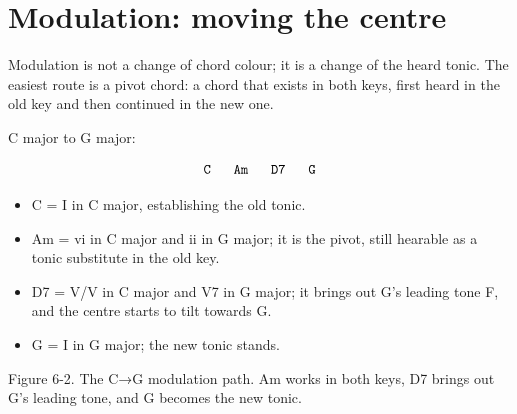 \section{Modulation: moving the centre}

Modulation is not a change of chord colour; it is a change of the heard tonic. The easiest route is a pivot chord: a chord that exists in both keys, first heard in the old key and then continued in the new one.

C major to G major:

\[
\texttt{C \;\; Am \;\; D7 \;\; G}
\]

\begin{itemize}
  \item C = I in C major, establishing the old tonic.
  \item Am = vi in C major and ii in G major; it is the pivot, still hearable as a tonic substitute in the old key.
  \item D7 = V/V in C major and V7 in G major; it brings out G's leading tone F\sharpsym, and the centre starts to tilt towards G.
  \item G = I in G major; the new tonic stands.
\end{itemize}

\begin{center}
\begin{minipage}{0.92\linewidth}
\centering
{}

Figure 6-2. The C→G modulation path. Am works in both keys, D7 brings out G's leading tone, and G becomes the new tonic.
\end{minipage}
\end{center}

